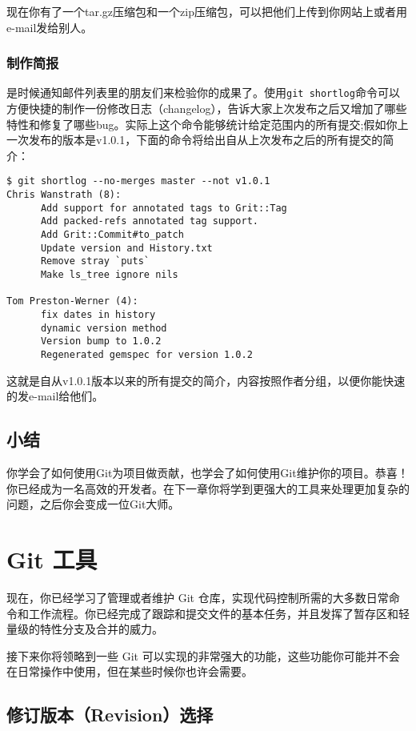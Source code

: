 \documentclass[a4paper]{book}
\newcommand{\chap}[1]{\newpage\thispagestyle{empty}\chapter{#1}\label{chap:\thechapter}}
\begin{document}
现在你有了一个tar.gz压缩包和一个zip压缩包，可以把他们上传到你网站上或者用e-mail发给别人。

\subsection{制作简报}

是时候通知邮件列表里的朋友们来检验你的成果了。使用\texttt{git shortlog}命令可以方便快捷的制作一份修改日志（changelog），告诉大家上次发布之后又增加了哪些特性和修复了哪些bug。实际上这个命令能够统计给定范围内的所有提交;假如你上一次发布的版本是v1.0.1，下面的命令将给出自从上次发布之后的所有提交的简介：

\begin{shaded}\begin{verbatim}
$ git shortlog --no-merges master --not v1.0.1
Chris Wanstrath (8):
      Add support for annotated tags to Grit::Tag
      Add packed-refs annotated tag support.
      Add Grit::Commit#to_patch
      Update version and History.txt
      Remove stray `puts`
      Make ls_tree ignore nils

Tom Preston-Werner (4):
      fix dates in history
      dynamic version method
      Version bump to 1.0.2
      Regenerated gemspec for version 1.0.2
\end{verbatim}\end{shaded}

这就是自从v1.0.1版本以来的所有提交的简介，内容按照作者分组，以便你能快速的发e-mail给他们。

\section{小结}

你学会了如何使用Git为项目做贡献，也学会了如何使用Git维护你的项目。恭喜！你已经成为一名高效的开发者。在下一章你将学到更强大的工具来处理更加复杂的问题，之后你会变成一位Git大师。

\chap{Git 工具}

现在，你已经学习了管理或者维护 Git 仓库，实现代码控制所需的大多数日常命令和工作流程。你已经完成了跟踪和提交文件的基本任务，并且发挥了暂存区和轻量级的特性分支及合并的威力。

接下来你将领略到一些 Git 可以实现的非常强大的功能，这些功能你可能并不会在日常操作中使用，但在某些时候你也许会需要。

\section{修订版本（Revision）选择}
\end{document}
